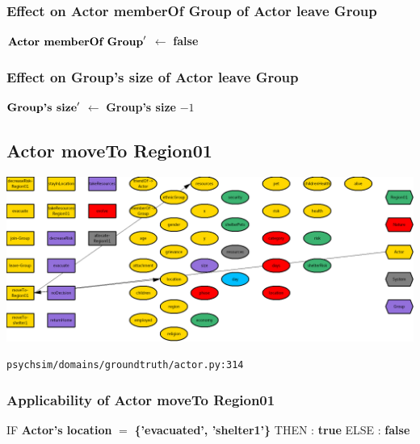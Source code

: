 \documentclass{article}%
\begin{document}
%
\subsubsection{Effect on Actor memberOf Group of Actor leave Group}%
\label{ssubsec:Effect on Actor memberOf Group of Actor leave Group}%
\begin{flushleft}%
$\mbox{\textbf{Actor memberOf Group}} '$%
$\leftarrow$%
\textbf{false}%
\end{flushleft}

%
\subsubsection{Effect on Group's size of Actor leave Group}%
\label{ssubsec:Effect on Group's size of Actor leave Group}%
\begin{flushleft}%
$\mbox{\textbf{Group's size}} '$%
$\leftarrow$%
\textbf{Group's size}%
${-}1$%
\end{flushleft}

%
\subsection{Actor moveTo Region01}%
\label{subsec:Actor moveTo Region01}%
\includegraphics[width=\textwidth]{images/Actor-moveTo-Region01.png}%
\begin{flushleft}%
\verb|psychsim/domains/groundtruth/actor.py:314|%
\end{flushleft}%
\subsubsection{Applicability of Actor moveTo Region01}%
\label{ssubsec:Applicability of Actor moveTo Region01}%
\begin{flushleft}%
IF %
\textbf{Actor's location}%
$=$%
\textbf{\{'evacuated', 'shelter1'\}}%
\linebreak%
\hspace*{2em}%
THEN %
: %
\textbf{true}%
\linebreak%
\hspace*{2em}%
ELSE %
: %
\textbf{false}%
\end{flushleft}
\end{document}
